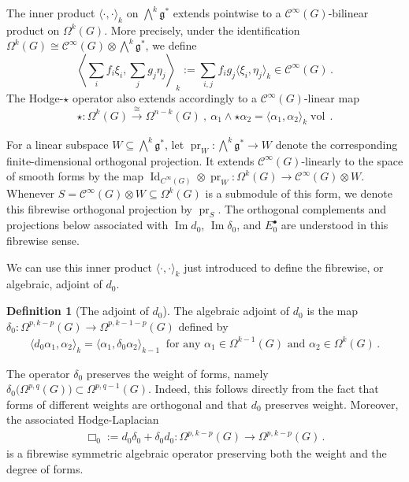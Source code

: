 \documentclass[dvipsnames]{amsart}
\theoremstyle{definition}
\newtheorem{definition}[theorem]{Definition}
\theoremstyle{definition}
\numberwithin{equation}{section}
\newcommand{\C}{\mathcal{C}}
\begin{document}
The inner product $\langle\cdot,\cdot\rangle_k$ on $\bigwedge^k\mathfrak g^\ast$ extends pointwise to a $\mathcal{C}^\infty(G)$-bilinear product on $\Omega^k(G)$. More precisely, under the identification $\Omega^k(G)
\cong
\mathcal C^\infty(G)\otimes\bigwedge\nolimits^k\mathfrak g^\ast$, we define
\begin{equation}\label{eq: def pointwise scalar product}
\left\langle
\sum_i f_i\xi_i,\sum_j g_j\eta_j
\right\rangle_k
:=
\sum_{i,j}f_ig_j\langle\xi_i,\eta_j\rangle_k
\in\mathcal C^\infty(G)\,.
\end{equation}
The Hodge-\(\star\) operator also extends accordingly to a
\(\mathcal C^\infty(G)\)-linear map
$$
\star\colon\Omega^k(G)\xrightarrow[]{\cong}\Omega^{n-k}(G)\ ,\ 
\alpha_1\wedge\star\alpha_2
=
\langle\alpha_1,\alpha_2\rangle_k\operatorname{vol}\,.
$$


For a linear subspace $W\subseteq\bigwedge^k\mathfrak{g}^\ast$, let $\operatorname{pr}_W\colon\bigwedge^k\mathfrak{g}^\ast\to W$ denote the corresponding finite-dimensional orthogonal projection. It extends $\C^\infty(G)$-linearly to the space of smooth forms by the map $\operatorname{Id}_{C^\infty(G)}\otimes\operatorname{pr}_W\colon\Omega^k(G)\to\C^\infty(G)\otimes W$. Whenever $S=\C^\infty(G)\otimes W\subseteq\Omega^k(G)$ is a submodule of this form, we denote this fibrewise orthogonal projection by $\operatorname{pr}_S$. The orthogonal complements and projections below associated with $\operatorname{Im}d_0$, $\operatorname{Im}\delta_0$, and $E_0^\bullet$ are understood in this fibrewise sense.



We can use this inner product $\langle\cdot,\cdot\rangle_k$ just introduced to define the fibrewise, or algebraic, adjoint of $d_0$.

\begin{definition}[The adjoint of $d_0$]\label{def: delta_0} The algebraic adjoint of $d_0$ is the map $\delta_0\colon\Omega^{p,k-p}(G)\to\Omega^{p,k-1-p}(G)$ defined by
\begin{align*}
    \langle d_0\alpha_1,\alpha_2\rangle_{k}=\langle\alpha_1,\delta_0\alpha_2\rangle_{k-1}\ \text{ for any }\alpha_1\in\Omega^{k-1}(G)\text{ and }\alpha_2\in\Omega^{k}(G)\,.
\end{align*}    
\end{definition}
The operator $\delta_0$ preserves the weight of forms, namely $\delta_0\big(\Omega^{p,q}(G)\big)\subset\Omega^{p,q-1}(G)$. Indeed, this follows directly from the fact that forms of different weights are orthogonal and that $d_0$ preserves weight. Moreover, the associated Hodge-Laplacian 
\begin{align*}
    \Box_0:=d_0\delta_0+\delta_0d_0\colon\Omega^{p,k-p}(G)\to\Omega^{p,k-p}(G)\,.
\end{align*}
is a fibrewise symmetric algebraic operator preserving both the weight and the degree of forms.
\end{document}
